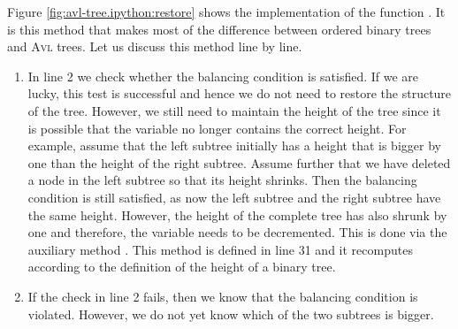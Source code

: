 Figure \ref{fig:avl-tree.ipython:restore} shows the implementation of the function .
It is this method that makes most of the difference between ordered binary trees and \textsc{Avl} trees.  Let
us discuss this method line by line.
\begin{enumerate}
\item In line 2 we check whether the balancing condition is satisfied.  If we are lucky,  this test 
      is successful and hence we do not need to restore the structure of the tree.  However, we
      still need to maintain the height of the tree since it is possible that the variable
       no longer contains the correct height.  For example, assume that the left subtree
      initially has a height that is bigger by one than the height of the right subtree.  Assume
      further that we have deleted a node in the left subtree so that its height shrinks.  Then the
      balancing condition is still satisfied, as now the left subtree and the right subtree have the
      same height.  However, the height of the complete tree has also shrunk by one and therefore, 
      the variable  needs to be decremented.  This is done via the auxiliary method
      .  This method is defined in line 31 and it recomputes 
      according to the definition of the height of a binary tree.
\item If the check in line 2 fails, then we know that the balancing condition is violated.
      However, we do not yet know which of the two subtrees is bigger.  


\end{enumerate}
